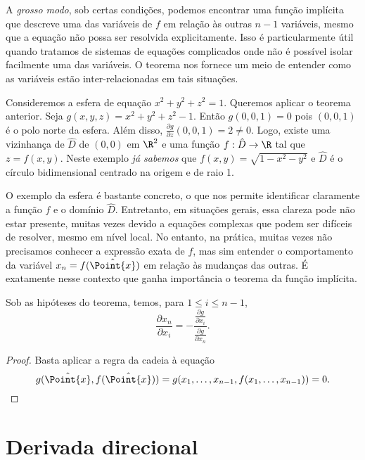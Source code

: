 A \textit{grosso modo}, sob certas condições, podemos encontrar uma função implícita que descreve uma das variáveis de \(f\) em relação às outras \(n-1\) variáveis, mesmo que a equação não possa ser resolvida explicitamente. Isso é particularmente útil quando tratamos de sistemas de equações complicados onde não é possível isolar facilmente uma das variáveis. O teorema nos fornece um meio de entender como as variáveis estão inter-relacionadas em tais situações.


\begin{example}{}{}
Consideremos a esfera de equação $x^2+y^2+z^2=1$. Queremos aplicar o teorema anterior. 
Seja $g(x,y,z)=x^2+y^2+z^2-1$. Então $g(0,0,1)=0$ pois $(0,0,1)$ é o polo norte da esfera. Além disso, $\frac{\partial g}{\partial z}(0,0,1)=2\neq 0$. Logo, existe uma vizinhança de  $\hat{D}$ de $(0,0)$ em $\R^2$ e uma função $f:\hat{D} \to \R$ tal que $z=f(x,y)$. 
Neste exemplo \textit{já sabemos} que  $f(x,y)=\sqrt{1-x^2-y^2}$ e $\hat{D}$ é o círculo bidimensional centrado na origem e de raio 1. 
\end{example}

O exemplo da esfera é bastante concreto, o que nos permite identificar claramente a função \(f\) e o domínio \(\hat{D}\). Entretanto, em situações gerais, essa clareza pode não estar presente, muitas vezes devido a equações complexas que podem ser difíceis de resolver, mesmo em nível local. No entanto, na prática, muitas vezes não precisamos conhecer a expressão exata de \(f\), mas sim entender o comportamento da variável $x_n=f(\hat{\Point{x}})$ em relação às mudanças das outras. É exatamente nesse contexto que ganha importância o teorema da função implícita. 

\begin{corollary}{}{}
    Sob as hipóteses do teorema, temos, para $1\leq i\leq n-1$,  
    $$\frac{\partial x_n}{\partial x_i}=-\dfrac{\frac{\partial g}{\partial x_i}}{\frac{\partial g}{\partial x_n}}.$$
\end{corollary}
\begin{proof}
    Basta aplicar a regra da cadeia à equação 
    \[g(\hat{\Point{x}}, f(\hat{\Point{x}})) = g(x_1,\dots,x_{n-1},f(x_1,\dots,x_{n-1}))=0.\] 
\end{proof}





\section{Derivada direcional}

